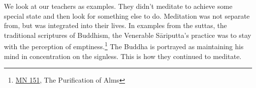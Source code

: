 
We look at our teachers as examples. They didn't meditate to achieve
some special state and then look for something else to do. Meditation
was not separate from, but was integrated into their lives. In examples
from the suttas, the traditional scriptures of Buddhism, the Venerable
Sāriputta's practice was to stay with the perception of
emptiness.\footnote{\href{https://suttacentral.net/mn151}{MN 151}, The
  Purification of Alms} The Buddha is portrayed as maintaining his mind
in concentration on the signless. This is how they continued to
meditate.
